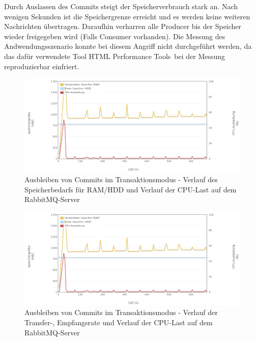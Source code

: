 \documentclass[	a4paper,
			11pt,
			oneside,
			parskip]{scrartcl}
\begin{document}
	
	\clearpage
		{
		  \newline
		  \newline
		  \newline
		}{
		 Durch Auslassen des Commits steigt der Speicherverbrauch stark an. Nach wenigen Sekunden ist die Speichergrenze erreicht und es werden keine weiteren Nachrichten übertragen. Daraufhin verharren alle Producer bis der Speicher wieder freigegeben wird (Falls Consumer vorhanden).
		}{
		 Die Messung des Andwendungsszenario konnte bei diesem Angriff nicht durchgeführt werden, da das dafür verwendete Tool \glqq HTML Performance Tools\grqq\ bei der Messung reproduzierbar einfriert.
		}

		\begin{figure}[!htb]
			\centering
			\includegraphics[width=\textwidth]{img/tx/tx_server1.png}
			\caption{Ausbleiben von Commits im Transaktionsmodus - Verlauf des Speicherbedarfs für RAM/HDD und Verlauf der CPU-Last auf dem RabbitMQ-Server}
			\label{fig:commit-server1}
		\end{figure}
		
		\begin{figure}[!htb]
			\centering
			\includegraphics[width=\textwidth]{img/tx/tx_server1.png}
			\caption{Ausbleiben von Commits im Transaktionsmodus - Verlauf der Transfer-, Empfangsrate und Verlauf der CPU-Last auf dem RabbitMQ-Server}
			\label{fig:commit-server2}
		\end{figure}
	
\end{document}
